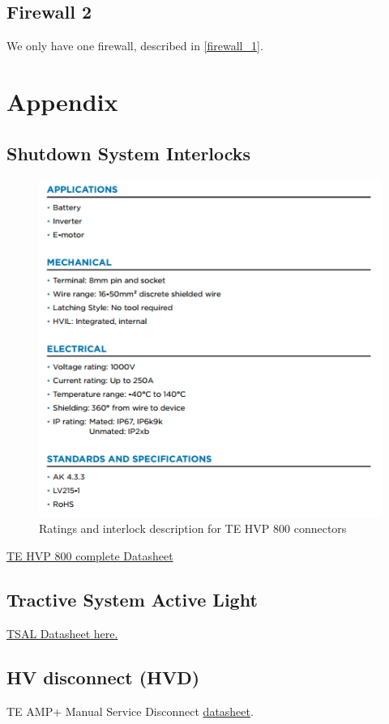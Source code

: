 \documentclass{article}
\begin{document}
\subsection{Firewall 2}\label{firewall_2}
We only have one firewall, described in \ref{firewall_1}.

\section{Appendix}\label{appendix}


\subsection{Shutdown System Interlocks}\label{sec:appendix_interlocks}
\begin{figure}[H]
	\includegraphics[width=.7 \linewidth]{HVP_800_ratings.png}
	\caption{Ratings and interlock description for TE HVP 800 connectors}
	\label{fig:hvp_800_ratings}
\end{figure}
\href{http://www.te.com/content/dam/te-com/documents/hybrid-and-electric-mobility-solutions/global/8-1773462-1-hvp-800.pdf}{TE HVP 800 complete Datasheet}

\hypertarget{TSALdatasheet}{}
\subsection{Tractive System Active Light}
\href{https://d114hh0cykhyb0.cloudfront.net/pdfs/MSTRB-X-X+Mini+Strobe+LED.pdf}{TSAL Datasheet here.}

\subsection{HV disconnect (HVD)}\label{sec:appendix_hvd}
TE AMP+ Manual Service Disconnect \href{http://www.te.com/content/dam/te-com/documents/hybrid-and-electric-mobility-solutions/global/8-1773462-2-msd.pdf}{datasheet}.
\end{document}
